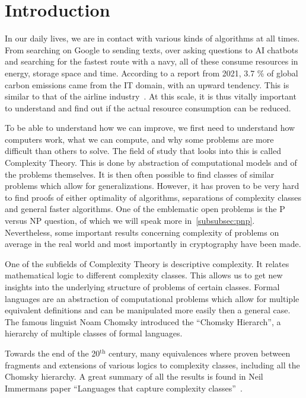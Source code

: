 \chapter{Introduction}\label{ch:intro}

In our daily lives, we are in contact with various kinds of algorithms at all times.
From searching on Google to sending texts, over asking questions to AI chatbots and searching for the fastest route with a navy, all of these consume resources in energy, storage space and time.
According to a report from 2021, 3.7 \% of global carbon emissions came from the IT domain, with an upward tendency.
This is similar to that of the airline industry~\cite{webFootprint}.
At this scale, it is thus vitally important to understand and find out if the actual resource consumption can be reduced.

To be able to understand how we can improve, we first need to understand how computers work, what we can compute, and why some problems are more difficult than others to solve.
The field of study that looks into this is called Complexity Theory.
This is done by abstraction of computational models and of the problems themselves.
It is then often possible to find classes of similar problems which allow for generalizations.
However, it has proven to be very hard to find proofs of either optimality of algorithms, separations of complexity classes and general faster algorithms.
One of the emblematic open problems is the P versus NP question, of which we will speak more in~\cref{subsubsec:pnp}.
Nevertheless, some important results concerning complexity of problems on average in the real world and most importantly in cryptography have been made.

One of the subfields of Complexity Theory is descriptive complexity.
It relates mathematical logic to different complexity classes.
This allows us to get new insights into the underlying structure of problems of certain classes.
Formal languages are an abstraction of computational problems which allow for multiple equivalent definitions and can be manipulated more easily then a general case.
The famous linguist Noam Chomsky introduced the ``Chomsky Hierarch'', a hierarchy of multiple classes of formal languages.

Towards the end of the 20$^{\text{th}}$ century, many equivalences where proven between fragments and extensions of various logics to complexity classes, including all the Chomsky hierarchy.
A great summary of all the results is found in Neil Immermans paper ``Languages that capture complexity classes''~\cite{Immerman1987}.

